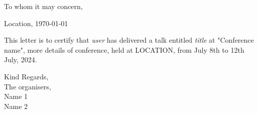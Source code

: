 \documentclass[11pt,english]{letter}
\begin{document}
To whom it may concern,

\begin{flushright}
	Location, \today
\end{flushright}

This letter is to certify that \textit{{user}} has
delivered a talk entitled \textit{{title}} at "Conference name",
more details of conference,
held at LOCATION, from July 8th to 12th July, 2024.

Kind Regards, \\
The organisers, \\
Name 1\\
Name 2
\end{document}

